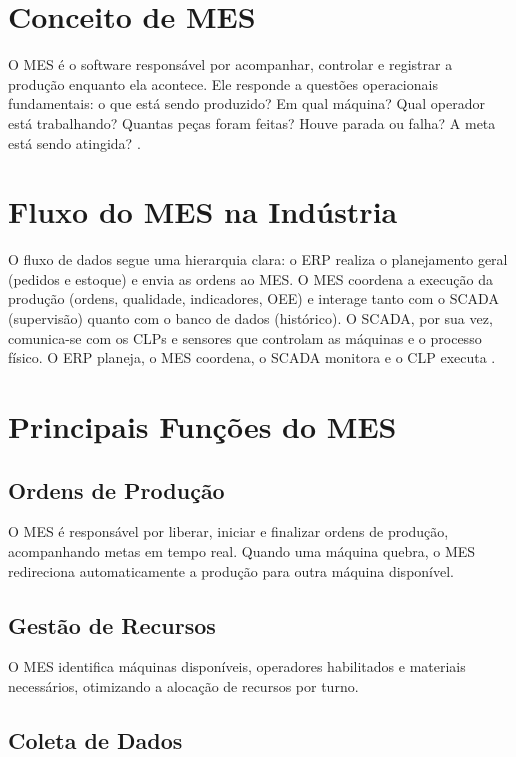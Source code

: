 \documentclass[12pt,a4paper,oneside]{article}
\begin{document}
\section{Conceito de MES}

O MES é o software responsável por acompanhar, controlar e registrar a produção enquanto ela acontece. Ele responde a questões operacionais fundamentais: o que está sendo produzido? Em qual máquina? Qual operador está trabalhando? Quantas peças foram feitas? Houve parada ou falha? A meta está sendo atingida? \cite{caiçara2015}.

\section{Fluxo do MES na Indústria}

O fluxo de dados segue uma hierarquia clara: o ERP realiza o planejamento geral (pedidos e estoque) e envia as ordens ao MES. O MES coordena a execução da produção (ordens, qualidade, indicadores, OEE) e interage tanto com o SCADA (supervisão) quanto com o banco de dados (histórico). O SCADA, por sua vez, comunica-se com os CLPs e sensores que controlam as máquinas e o processo físico. O ERP planeja, o MES coordena, o SCADA monitora e o CLP executa \cite{moraes2007}.

\section{Principais Funções do MES}

\subsection{Ordens de Produção}

O MES é responsável por liberar, iniciar e finalizar ordens de produção, acompanhando metas em tempo real. Quando uma máquina quebra, o MES redireciona automaticamente a produção para outra máquina disponível.

\subsection{Gestão de Recursos}

O MES identifica máquinas disponíveis, operadores habilitados e materiais necessários, otimizando a alocação de recursos por turno.

\subsection{Coleta de Dados}
\end{document}
